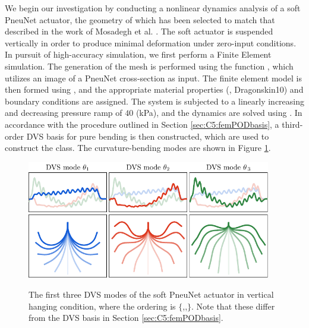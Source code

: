 We begin our investigation by conducting a nonlinear dynamics analysis of a soft PneuNet actuator, the geometry of which has been selected to match that described in the work of Mosadegh et al. \cite{Mosadegh2014}. The soft actuator is suspended vertically in order to produce minimal deformation under zero-input conditions. In pursuit of high-accuracy simulation, we first perform a Finite Element simulation. The generation of the mesh is performed using the function , which utilizes an image of a PneuNet cross-section as input. The finite element model is then formed using , and the appropriate material properties (\ie, Dragonskin10) and boundary conditions are assigned. The system is subjected to a linearly increasing and decreasing pressure ramp of $40$ (\si{\kilo \pascal}), and the dynamics are solved using . In accordance with the procedure outlined in Section \ref{sec:C5:femPODbasis}, a third-order DVS basis for pure bending is then constructed, which are used to construct the  class. The curvature-bending modes are shown in Figure \ref{fig:C5:pneunet_modes_fem}. 
%
\begin{figure}[!t]
    \centering
    \includegraphics*[width=0.95\textwidth]{./pdf/thesis-figure-6-32-1.pdf} \\[0.25em]
    \includegraphics*[width=0.95\textwidth]{./pdf/thesis-figure-6-32-2.pdf}
    \caption{The first three DVS modes of the soft PneuNet actuator in vertical hanging condition, where the ordering is $\{$,,$\}$. Note that these differ from the DVS basis in Section \ref{sec:C5:femPODbasis}.}
    \label{fig:C5:pneunet_modes_fem}
    \vspace{-3mm}
\end{figure}
%

